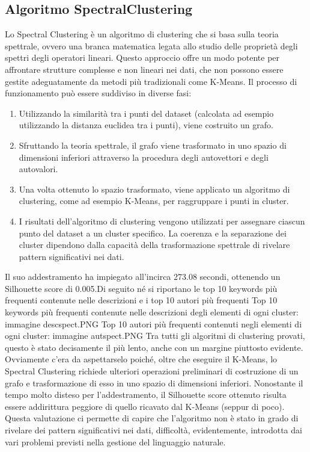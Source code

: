 \documentclass[12pt,oneside]{article}
\begin{document}
    \begin{enumerate}
    \subsection{Algoritmo SpectralClustering}
    \begin{justify}
    Lo Spectral Clustering è un algoritmo di clustering che si basa sulla teoria spettrale, ovvero una branca matematica legata allo studio delle proprietà degli spettri degli operatori lineari. Questo approccio offre un modo potente per affrontare strutture complesse e non lineari nei dati, che non possono essere gestite adeguatamente da metodi più tradizionali come K-Means. 
    Il processo di funzionamento può essere suddiviso in diverse fasi:
    \begin{enumerate}[label=\arabic*)]
        \item Utilizzando la similarità tra i punti del dataset (calcolata ad esempio utilizzando la distanza euclidea tra i punti), viene costruito un grafo. 
        \item Sfruttando la teoria spettrale, il grafo viene trasformato in uno spazio di dimensioni inferiori attraverso la procedura degli autovettori e degli autovalori.
        \item Una volta ottenuto lo spazio trasformato, viene applicato un algoritmo di clustering, come ad esempio K-Means, per raggruppare i punti in cluster. 
        \item I risultati dell'algoritmo di clustering vengono utilizzati per assegnare ciascun punto del dataset a un cluster specifico. La coerenza e la separazione dei cluster dipendono dalla capacità della trasformazione spettrale di rivelare pattern significativi nei dati.
    \end{enumerate}
    Il suo addestramento ha impiegato all’incirca 273.08 secondi, ottenendo un Silhouette score di 0.005.Di seguito né si riportano le top 10 keywords più frequenti contenute nelle descrizioni e i top 10 autori più frequenti
    Top 10 keywords più frequenti contenute nelle descrizioni degli elementi di ogni cluster:
    immagine descspect.PNG
    Top 10 autori più frequenti contenuti negli elementi di ogni cluster:
    immagine autspect.PNG
    Tra tutti gli algoritmi di clustering provati, questo è stato decisamente il più lento, anche con un margine piuttosto evidente. Ovviamente c’era da aspettarselo poiché, oltre che eseguire il K-Means, lo Spectral Clustering richiede ulteriori operazioni preliminari di costruzione di un grafo e trasformazione di esso in uno spazio di dimensioni inferiori. Nonostante il tempo molto disteso per l’addestramento, il Silhouette score ottenuto risulta essere addirittura peggiore di quello ricavato dal K-Means (seppur di poco). Questa valutazione ci permette di capire che l’algoritmo non è stato in grado di rivelare dei pattern significativi nei dati, difficoltà, evidentemente, introdotta dai vari problemi previsti nella gestione del linguaggio naturale.
    \end{justify}
    \end{enumerate}
\end{document}
